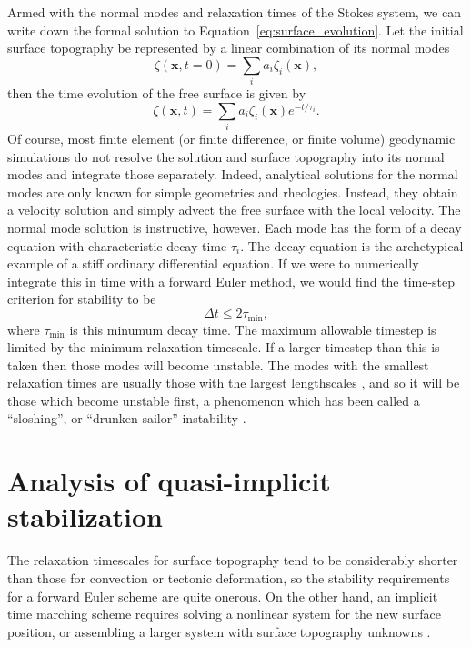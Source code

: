\documentclass[preprint,12pt,authoryear]{elsarticle}
\begin{document}
Armed with the normal modes and relaxation times of the Stokes system, we can write down the
formal solution to Equation~\eqref{eq:surface_evolution}. Let the initial surface topography be 
represented by a linear combination of its normal modes
\begin{equation}
\zeta(\mathbf{x}, t=0) = \displaystyle \sum_i a_i \zeta_i(\mathbf{x}),
\end{equation}
then the time evolution of the free surface is given by
\begin{equation}
\zeta( \mathbf{x}, t) = \displaystyle \sum_i a_i \zeta_i(\mathbf{x}) e^{-t/\tau_i}.
\end{equation}
Of course, most finite element (or finite difference, or finite volume) geodynamic simulations do not resolve 
the solution and surface topography into its normal modes and integrate those separately. 
Indeed, analytical solutions for the normal modes are only known for simple geometries and rheologies.
Instead, they obtain a velocity solution and simply advect the free surface with the local velocity.
The normal mode solution is instructive, however. 
Each mode has the form of a decay equation with characteristic decay time $\tau_i$.
The decay equation is the archetypical example of a stiff ordinary differential equation.
If we were to numerically integrate this in time with a forward Euler method, we would find the 
time-step criterion for stability \citep[e.g.][]{leveque2007finite} to be
\begin{equation}
\Delta t  \le 2 \tau_{\mathrm{min}},
\label{eq:cfl_euler}
\end{equation}
where $\tau_{\mathrm{min}}$ is this minumum decay time.
The maximum allowable timestep is limited by the minimum relaxation timescale.
If a larger timestep than this is taken then those modes will become unstable.
The modes with the smallest relaxation times are usually those with the largest lengthscales \citep{schubert2001mantle}, 
and so it will be those which become unstable first, a phenomenon which has been called 
a ``sloshing'', or ``drunken sailor'' instability \citep{kaus2010stabilization}.

\section{Analysis of quasi-implicit stabilization}
\label{sec:kmm}

The relaxation timescales for surface topography tend to be considerably shorter than those for 
convection or tectonic deformation, so the stability requirements for a forward Euler scheme
are quite onerous.  On the other hand, an implicit time marching scheme requires solving 
a nonlinear system for the new surface position, or assembling a larger system with surface
topography unknowns \citep[e.g.][]{kramer2012implicit}.
\end{document}
